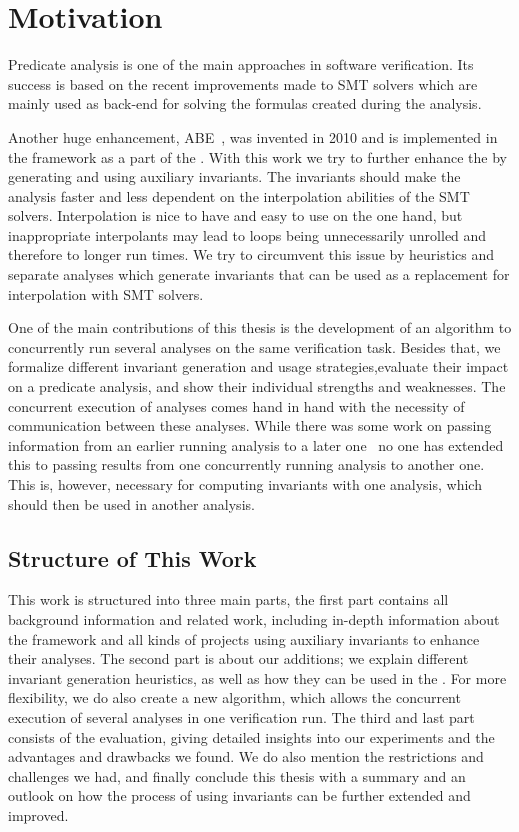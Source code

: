 \chapter{Motivation}
Predicate analysis is one of the main approaches in software verification. Its success is based on the recent improvements made to \acs{SMT} solvers which are mainly used as back-end for solving
the formulas created during the analysis.

Another huge enhancement, \acl{ABE}~\cite{Beyer:PredicateAbstraction}, was invented in 2010 and is implemented in the \CPAchecker{} framework as a part of the 
\PredicateCPA{}. With this work we try to further enhance the \PredicateCPA{} by generating and using auxiliary invariants. The invariants should make the analysis faster and less dependent on the
interpolation abilities of the \acs{SMT} solvers. Interpolation is nice to have and easy to use on the one hand, but inappropriate interpolants may lead to loops being unnecessarily unrolled and therefore
to longer run times. We try to circumvent this issue by heuristics and separate analyses which generate invariants that can be used as a replacement for interpolation with \acs{SMT} solvers.

One of the main contributions of this thesis is the development of an algorithm to concurrently run several analyses on the same verification task. Besides that,
we formalize different invariant generation and usage strategies,evaluate their impact on a predicate analysis, and show their individual strengths and weaknesses.
The concurrent execution of analyses comes hand in hand with the necessity of 
communication between these analyses. While there was some work on passing information from an earlier running analysis to a later one~\cite{Beyer:PrecisionReuse}
no one has extended this to passing results from one concurrently running analysis to another one. This is, however, necessary for computing invariants with one analysis,
which should then be used in another analysis.

\clearpage
\section*{Structure of This Work}
This work is structured into three main parts, the first part contains all background information and related work, including in-depth information about the \CPAchecker{} framework and all kinds of 
projects using auxiliary invariants to enhance their analyses. The second part is about our additions; we explain different invariant generation heuristics, as well as how they can be used in the 
\PredicateCPA{}. For more flexibility, we do also create a new algorithm, which allows the concurrent execution of several analyses in one verification run.
The third and last part consists of the evaluation, giving detailed insights into our experiments and the advantages and drawbacks we found. We do also mention the restrictions
and challenges we had, and finally conclude this thesis with a summary and an outlook on how the process of using invariants can be further extended and improved.